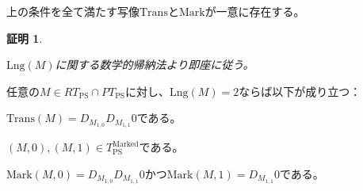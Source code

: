 \documentclass[dvipdfmx,uplatex]{jsarticle}
\theoremstyle{customnonumberbreakfortheorem}
\theoremstyle{customnonumberbreakforproof}
\newtheorem{hideableproof}{証明}
\begin{document}
\begin{proposition}\label{Transのwell-defined性}
	上の条件を全て満たす写像\(\textrm{Trans}\)と\(\textrm{Mark}\)が一意に存在する。
\end{proposition}

\begin{hideableproof}
	\begin{indented}
		\item \(\textrm{Lng}(M)\)に関する数学的帰納法より即座に従う。
	\end{indented}
\end{hideableproof}

\begin{proposition}[\(2\)列ペア数列の基本性質]\label{2列ペア数列の基本性質}
	任意の\(M \in RT_{\textrm{PS}} \cap PT_{\textrm{PS}}\)に対し、\(\textrm{Lng}(M) = 2\)ならば以下が成り立つ：
	\begin{penumerate}
		\item \(\textrm{Trans}(M) = D_{M_{1,0}} D_{M_{1,1}} 0\)である。
		\item \((M,0),(M,1) \in T_{\textrm{PS}}^{\textrm{Marked}}\)である。
		\item \(\textrm{Mark}(M,0) = D_{M_{1,0}} D_{M_{1,1}} 0\)かつ\(\textrm{Mark}(M,1) = D_{M_{1,1}} 0\)である。
	\end{penumerate}
\end{proposition}
\end{document}
